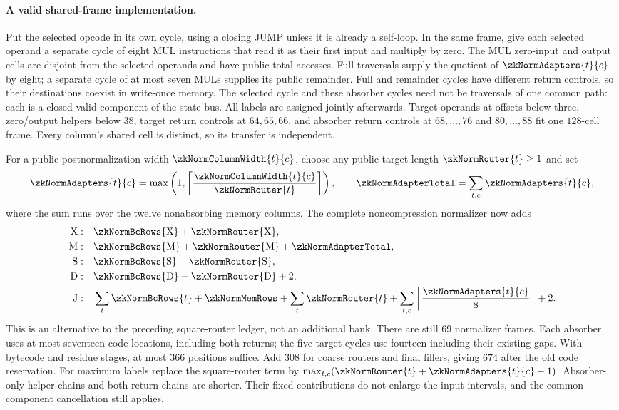 \paragraph{A valid shared-frame implementation.} Put the selected opcode in its own cycle, using a closing JUMP unless it is already a self-loop. In the same frame, give each selected operand a separate cycle of eight MUL instructions that read it as their first input and multiply by zero. The MUL zero-input and output cells are disjoint from the selected operands and have public total accesses. Full traversals supply the quotient of $\zkNormAdapters{t}{c}$ by eight; a separate cycle of at most seven MULs supplies its public remainder. Full and remainder cycles have different return controls, so their destinations coexist in write-once memory. The selected cycle and these absorber cycles need not be traversals of one common path: each is a closed valid component of the state bus. All labels are assigned jointly afterwards. Target operands at offsets below three, zero/output helpers below $38$, target return controls at $64,65,66$, and absorber return controls at $68,\ldots,76$ and $80,\ldots,88$ fit one $128$-cell frame. Every column's shared cell is distinct, so its transfer is independent.

For a public postnormalization width $\zkNormColumnWidth{t}{c}$, choose any public target length $\zkNormRouter{t}\ge1$ and set
\[
 \zkNormAdapters{t}{c}
 =\max\left(1,\left\lceil\frac{\zkNormColumnWidth{t}{c}}{\zkNormRouter{t}}\right\rceil\right),
 \qquad
 \zkNormAdapterTotal=\sum_{t,c}\zkNormAdapters{t}{c},
\]
where the sum runs over the twelve nonabsorbing memory columns. The complete noncompression normalizer now adds
\[
\begin{aligned}
 \mathrm X:&\quad\zkNormBcRows{\mathrm X}+\zkNormRouter{\mathrm X},\\
 \mathrm M:&\quad\zkNormBcRows{\mathrm M}+\zkNormRouter{\mathrm M}+\zkNormAdapterTotal,\\
 \mathrm S:&\quad\zkNormBcRows{\mathrm S}+\zkNormRouter{\mathrm S},\\
 \mathrm D:&\quad\zkNormBcRows{\mathrm D}+\zkNormRouter{\mathrm D}+2,\\
 \mathrm J:&\quad\sum_t\zkNormBcRows{t}+\zkNormMemRows+\sum_t\zkNormRouter{t}
  +\sum_{t,c}\left\lceil\frac{\zkNormAdapters{t}{c}}8\right\rceil+2.
\end{aligned}
\]
This is an alternative to the preceding square-router ledger, not an additional bank. There are still $69$ normalizer frames. Each absorber uses at most seventeen code locations, including both returns; the five target cycles use fourteen including their existing gaps. With bytecode and residue stages, at most $366$ positions suffice. Add $308$ for coarse routers and final fillers, giving $674$ after the old code reservation. For maximum labels replace the square-router term by $\max_{t,c}(\zkNormRouter{t}+\zkNormAdapters{t}{c}-1)$. Absorber-only helper chains and both return chains are shorter. Their fixed contributions do not enlarge the input intervals, and the common-component cancellation still applies.

